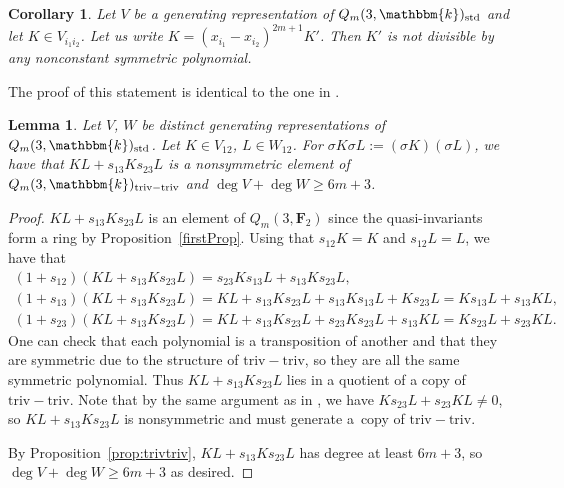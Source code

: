 \documentclass[11pt]{article}
\numberwithin{equation}{section}
\newtheorem{Corollary}[Theorem]{Corollary}
\newtheorem{Lemma}[Theorem]{Lemma}
\theoremstyle{definition}
\numberwithin{equation}{section}
\renewcommand{\k}{\mathbbm{k}}
\newcommand{\std}{\mathrm{std}}
\newcommand{\trtr}{\mathrm{triv-triv}}
\begin{document}
\begin{Corollary}
 Let $V$ be a generating representation of $Q_m(3,\k)_\std$ and let $K\in V_{i_1i_2}$. Let us write $K=(x_{i_1}-x_{i_2})^{2m+1}K'$. Then $K'$ is not divisible by any nonconstant symmetric polynomial.
\end{Corollary}

The proof of this statement is identical to the one in \cite{wang2022explicit}.

\begin{Lemma}\label{char3.4}
 Let $V$, $W$ be distinct generating representations of $Q_m(3,\k)_\std$. Let ${K\in V_{12}}$, ${L\in W_{12}}$. For $\sigma K\sigma L:=(\sigma K)(\sigma L)$, we have that $KL+s_{13}Ks_{23}L$ is a nonsymmetric element of $Q_m(3,\k)_\trtr$ and $\deg V+\deg W\geq 6m+3$.
\end{Lemma}
\begin{proof}
 $KL+s_{13}Ks_{23}L$ is an element of $Q_m(3,\mathbf{F}_2)$ since the quasi-invariants form a ring by Proposition~\ref{firstProp}. Using that $s_{12}K=K$ and $s_{12}L=L$, we have that
 \begin{gather*}
 (1+s_{12})(KL+s_{13}Ks_{23}L) = s_{23}Ks_{13}L+s_{13}Ks_{23}L,\\
 (1+s_{13})(KL+s_{13}Ks_{23}L) = KL+s_{13}Ks_{23}L+s_{13}Ks_{13}L + Ks_{23}L = Ks_{13}L+s_{13}KL,\\
 (1+s_{23})(KL+s_{13}Ks_{23}L) = KL+s_{13}Ks_{23}L+s_{23}Ks_{23}L + s_{13}KL = Ks_{23}L+s_{23}KL.
 \end{gather*}
 One can check that each polynomial is a transposition of another and that they are symmetric due to the structure of $\trtr$, so they are all the same symmetric polynomial. Thus ${KL+s_{13}Ks_{23}L}$ lies in a quotient of a copy of $\trtr$. Note that by the same argument as in \cite{wang2022explicit}, we have $Ks_{23}L+s_{23}KL\neq 0$, so $KL+s_{13}Ks_{23}L$ is nonsymmetric and must generate a~copy of $\trtr$.

 By Proposition~\ref{prop:trivtriv}, $KL+s_{13}Ks_{23}L$ has degree at least $6m+3$, so $\deg V+\deg W\geq 6m+3$ as desired.
\end{proof}
\end{document}
